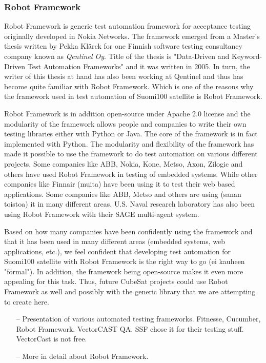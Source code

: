 \documentclass[english,12pt,a4paper,pdftex,elec,utf8]{aaltothesis}
\begin{document}
\subsubsection{Robot Framework}
Robot Framework is generic test automation framework for acceptance testing originally developed in Nokia Networks. The framework emerged from a Master's thesis written by Pekka Klärck for one Finnish software testing consultancy company known as \textit{Qentinel Oy}. Title of the thesis is "Data-Driven and Keyword-Driven Test Automation Frameworks" and it was written in 2005. In turn, the writer of this thesis at hand has also been working at Qentinel and thus has become quite familiar with Robot Framework. Which is one of the reasons why the framework used in test automation of Suomi100 satellite is Robot Framework. \cite{robotmain, klerkdippa} \par 
Robot Framework is in addition open-source under Apache 2.0 license and the modularity of the framework allows people and companies to write their own testing libraries either with Python or Java. The core of the framework is in fact implemented with Python.
The modularity and flexibility of the framework has made it possible to use the framework to do test automation on various different projects. Some companies like ABB, Nokia, Kone, Metso, Axon, Zilogic and others have used Robot Framework in testing of embedded systems. While other companies like Finnair (muita) have been using it to test their web based applications. Some companies like ABB, Metso and others are using (sanan toistoa) it in many different areas. U.S. Naval research laboratory has also been using Robot Framework with their SAGE multi-agent system. \cite{robotmain}\par 
Based on how many companies have been confidently using the framework and that it has been used in many different areas (embedded systems, web applications, etc.), we feel confident that developing test automation for Suomi100 satellite with Robot Framework is the right way to go (ei kauheen "formal"). In addition, the framework being open-source makes it even more appealing for this task. Thus, future CubeSat projects could use Robot Framework as well and possibly with the generic library that we are attempting to create here.\par   
\begin{itemize}
\item[--]Presentation of various automated testing frameworks. Fitnesse, Cucumber, Robot Framework. VectorCAST QA. SSF chose it for their testing stuff. VectorCast is not free.
\item[--]More in detail about Robot Framework.
\end{itemize}
\end{document}
